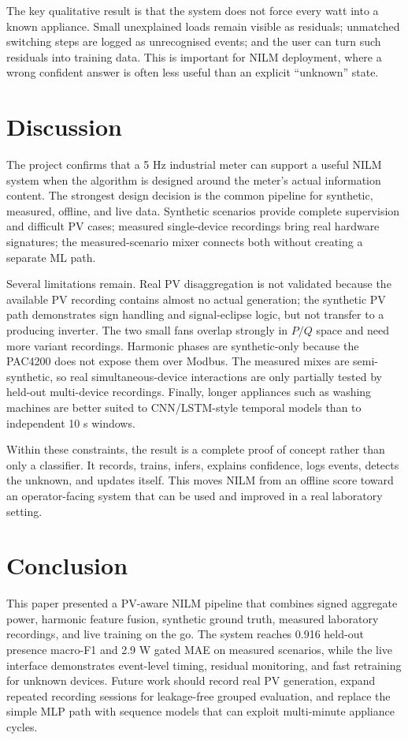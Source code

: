 \documentclass[letterpaper,journal]{IEEEtran}
\begin{document}
The key qualitative result is that the system does not force every watt into a known appliance. Small unexplained loads remain visible as residuals; unmatched switching steps are logged as unrecognised events; and the user can turn such residuals into training data. This is important for NILM deployment, where a wrong confident answer is often less useful than an explicit ``unknown'' state.

\section{Discussion}

The project confirms that a 5 Hz industrial meter can support a useful NILM system when the algorithm is designed around the meter's actual information content. The strongest design decision is the common pipeline for synthetic, measured, offline, and live data. Synthetic scenarios provide complete supervision and difficult PV cases; measured single-device recordings bring real hardware signatures; the measured-scenario mixer connects both without creating a separate ML path.

Several limitations remain. Real PV disaggregation is not validated because the available PV recording contains almost no actual generation; the synthetic PV path demonstrates sign handling and signal-eclipse logic, but not transfer to a producing inverter. The two small fans overlap strongly in $P/Q$ space and need more variant recordings. Harmonic phases are synthetic-only because the PAC4200 does not expose them over Modbus. The measured mixes are semi-synthetic, so real simultaneous-device interactions are only partially tested by held-out multi-device recordings. Finally, longer appliances such as washing machines are better suited to CNN/LSTM-style temporal models than to independent 10 s windows.

Within these constraints, the result is a complete proof of concept rather than only a classifier. It records, trains, infers, explains confidence, logs events, detects the unknown, and updates itself. This moves NILM from an offline score toward an operator-facing system that can be used and improved in a real laboratory setting.

\section{Conclusion}

This paper presented a PV-aware NILM pipeline that combines signed aggregate power, harmonic feature fusion, synthetic ground truth, measured laboratory recordings, and live training on the go. The system reaches 0.916 held-out presence macro-F1 and 2.9 W gated MAE on measured scenarios, while the live interface demonstrates event-level timing, residual monitoring, and fast retraining for unknown devices. Future work should record real PV generation, expand repeated recording sessions for leakage-free grouped evaluation, and replace the simple MLP path with sequence models that can exploit multi-minute appliance cycles.

\hfill \break


\FloatBarrier



\end{document}
